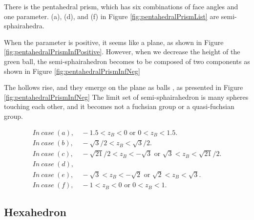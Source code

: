 \documentclass[suppldata, dvipdfmx]{interact}
\theoremstyle{plain}%
\theoremstyle{definition}
\theoremstyle{remark}
\theoremstyle{problemstyle}
\begin{document}
There is the pentahedral prism, which has six combinations of face angles
and one parameter.
(a), (d), and (f) in Figure \ref{fig:pentahedralPrismList} are
semi-sphairahedra.

When the parameter is positive, it seems like a plane, as shown in 
Figure \ref{fig:pentahedralPrismInfPositive}.
 However, when we decrease the height of the green ball, the
 semi-sphairahedron
 becomes to be composed of two components as shown in Figure \ref{fig:pentahedralPrismInfNeg}

The hollows rise, and they emerge on the plane as balls
, as presented in Figure \ref{fig:pentahedralPrismInfNeg}
The limit set of semi-sphairahedron is many spheres touching each other, and
it becomes not a fuchsian group or a quasi-fuchsian group.

\begin{align*} 
 In~case~(a),&~-1.5 < z_B < 0 \text{ or } 0 < z_B < 1.5.\\
 In~case~(b),&~-\sqrt{3}/2 < z_B < \sqrt{3}/2.\\
 In~case~(c),&~-\sqrt{21}/2 < z_B < -\sqrt{3} \text{ or } \sqrt{3} < z_B < \sqrt{21}/2.\\
 In~case~(d),&~\\%
 In~case~(e),&~-\sqrt{3} < z_B < -\sqrt{2} \text{ or } \sqrt{2} < z_B < \sqrt{3}.\\
 In~case~(f),&~-1 < z_B < 0 \text{ or } 0 < z_B < 1.
\end{align*}

\subsection{Hexahedron}
\end{document}
